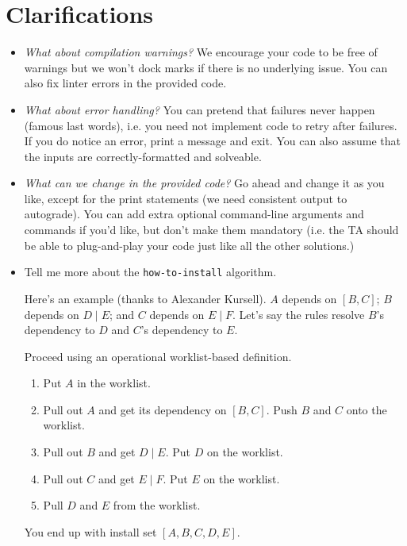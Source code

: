 \documentclass[12pt]{article}
\renewcommand{\_}{\kern-1.5pt\textunderscore\kern-1.5pt}
\begin{document}
\section*{Clarifications}
\begin{itemize}
\item \emph{What about compilation warnings?} We encourage your code to be free of warnings but we won't dock marks if there is no underlying issue. You can also fix linter errors in the provided code.
\item \emph{What about error handling?} You can pretend that failures never happen (famous last words), i.e. you need not implement code to retry after failures. If you do notice an error, print a message and exit. You can also assume that the inputs are correctly-formatted and solveable.
  \item \emph{What can we change in the provided code?} Go ahead and change it as you like, except for the print statements (we need consistent output to autograde). You can add extra optional command-line arguments and commands if you'd like, but don't make them mandatory (i.e. the TA should be able to plug-and-play your code just like all the other solutions.) 
\item Tell me more about the \texttt{how-to-install} algorithm.

\vspace{1em} Here's an example (thanks to Alexander Kursell). $A$ depends on $[B, C]$; $B$ depends on $D \mid E$; and $C$ depends on $E \mid F$. Let's say the rules resolve $B$'s dependency to $D$ and $C$'s dependency to $E$.

\vspace{1em} Proceed using an operational worklist-based definition. 
\begin{enumerate}[noitemsep]
\item Put $A$ in the worklist.
\item Pull out $A$ and get its dependency on $[B, C]$. Push $B$ and $C$ onto the worklist.
\item Pull out $B$ and get $D \mid E$. Put $D$ on the worklist.
\item Pull out $C$ and get $E \mid F$. Put $E$ on the worklist.
\item Pull $D$ and $E$ from the worklist.
\end{enumerate}
You end up with install set $[A, B, C, D, E]$.


\end{itemize}
\end{document}
